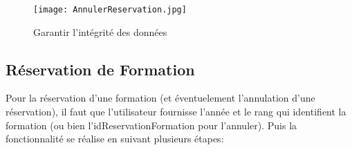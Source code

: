 \begin{figure}[H]
    \centering
    \texttt{[image: AnnulerReservation.jpg]}\\[1cm]
    \caption{Garantir l'intégrité des données}
    \label{fig:enter-label}
\end{figure}




\subsection{Réservation de Formation}
Pour la réservation d'une formation (et éventuelement l'annulation d'une réservation), il faut que l'utilisateur fournisse l'année et le rang qui identifient la formation (ou bien l'idReservationFormation pour l'annuler). Puis la fonctionnalité se réalise en suivant plusieurs étapes:
